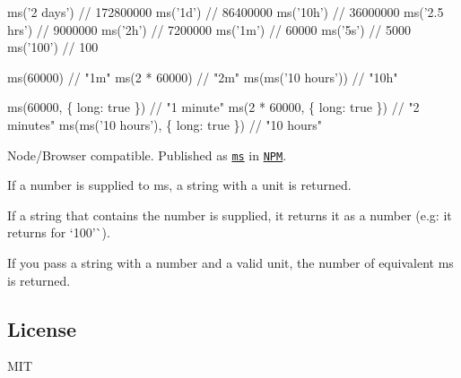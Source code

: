 
\begin{DoxyCode}
ms('2 days')  // 172800000
ms('1d')      // 86400000
ms('10h')     // 36000000
ms('2.5 hrs') // 9000000
ms('2h')      // 7200000
ms('1m')      // 60000
ms('5s')      // 5000
ms('100')     // 100
\end{DoxyCode}



\begin{DoxyCode}
ms(60000)             // "1m"
ms(2 * 60000)         // "2m"
ms(ms('10 hours'))    // "10h"
\end{DoxyCode}



\begin{DoxyCode}
ms(60000, \{ long: true \})             // "1 minute"
ms(2 * 60000, \{ long: true \})         // "2 minutes"
ms(ms('10 hours'), \{ long: true \})    // "10 hours"
\end{DoxyCode}



\begin{DoxyItemize}
\item Node/\+Browser compatible. Published as \href{https://www.npmjs.org/package/ms}{\tt {\ttfamily ms}} in \href{http://nodejs.org/download}{\tt N\+PM}.
\item If a number is supplied to {\ttfamily ms}, a string with a unit is returned.
\item If a string that contains the number is supplied, it returns it as a number (e.\+g\+: it returns {} for `\textquotesingle{}100'\`{}).
\item If you pass a string with a number and a valid unit, the number of equivalent ms is returned.
\end{DoxyItemize}

\subsection*{License}

M\+IT 